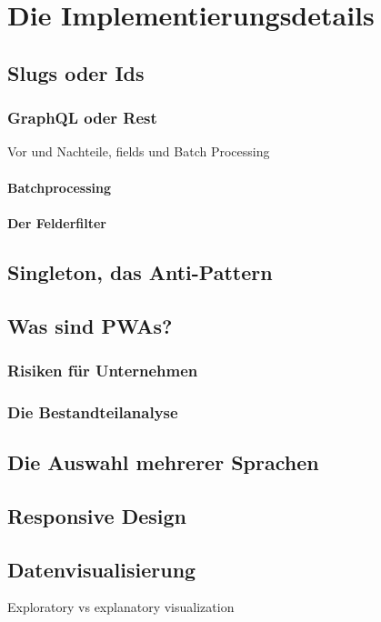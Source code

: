 \chapter{Die Implementierungsdetails}

\section{Slugs oder Ids}

\subsection{GraphQL oder Rest}
Vor und Nachteile, fields und Batch Processing

\subsubsection{Batchprocessing}

\subsubsection{Der Felderfilter}

\section{Singleton, das Anti-Pattern}
\section{Was sind PWAs?}

\subsection{Risiken für Unternehmen}

\subsection{Die Bestandteilanalyse}

\section{Die Auswahl mehrerer Sprachen}

\section{Responsive Design}

\section{Datenvisualisierung}
Exploratory vs explanatory visualization



